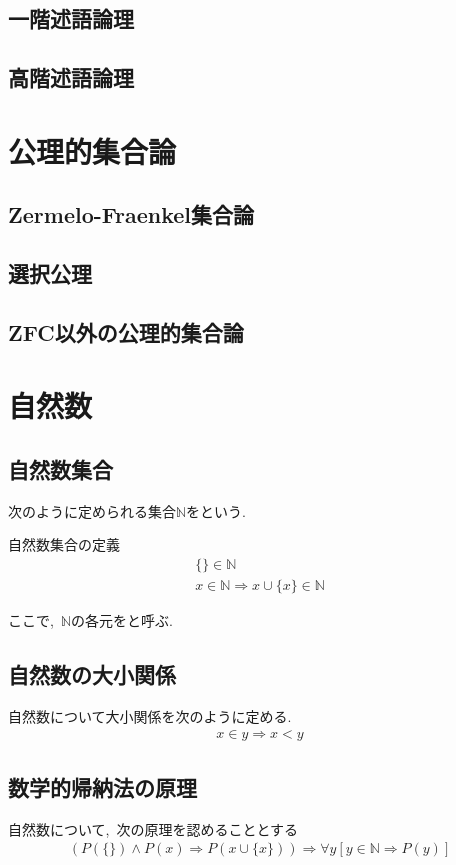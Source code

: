 \documentclass[hyperref,a4paper,12pt]{kininaruki}
\begin{document}
\subsection{一階述語論理}
\newpage
\subsection{高階述語論理}
\newpage
\section{公理的集合論}
\newpage
\subsection{Zermelo-Fraenkel集合論}
\newpage
\subsection{選択公理}
\newpage
\subsection{ZFC以外の公理的集合論}
\newpage
\section{自然数}
\subsection{自然数集合}
次のように定められる集合$\mathbb{N}$をという.
\begin{itembox}[l]{自然数集合の定義}
\begin{align}
    \{\}\in\mathbb{N}\\
    x\in\mathbb{N}\Rightarrow x\cup\{x\}\in\mathbb{N}
\end{align}
\end{itembox}

ここで,\, $\mathbb{N}$の各元をと呼ぶ.
\subsection{自然数の大小関係}
自然数について大小関係を次のように定める.
\begin{align}
    x\in y\Rightarrow x < y
\end{align}
\subsection{数学的帰納法の原理}
自然数について,\, 次の原理を認めることとする
\begin{align}
    (P(\{\}) \land P(x)\Rightarrow P(x\cup\{x\}))\Rightarrow\forall y [y\in\mathbb{N}\Rightarrow P(y)]
\end{align}
\end{document}

